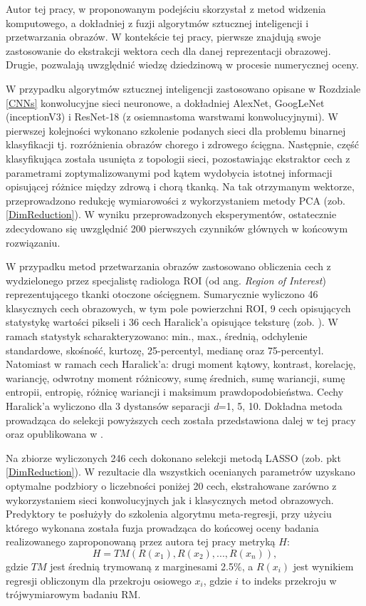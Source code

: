 Autor tej pracy, w proponowanym podejściu skorzystał z metod widzenia komputowego, a dokładniej z fuzji algorytmów sztucznej inteligencji i przetwarzania obrazów. W kontekście tej pracy, pierwsze znajdują swoje zastosowanie do ekstrakcji wektora cech dla danej reprezentacji obrazowej. Drugie, pozwalają uwzględnić wiedzę dziedzinową w procesie numerycznej oceny.

W przypadku algorytmów sztucznej inteligencji zastosowano  opisane w Rozdziale \ref{CNNs} konwolucyjne sieci neuronowe, a dokładniej AlexNet, GoogLeNet (inceptionV3) i ResNet-18 (z osiemnastoma warstwami konwolucyjnymi). W pierwszej kolejności wykonano szkolenie podanych sieci dla problemu binarnej klasyfikacji tj. rozróżnienia obrazów chorego i zdrowego ścięgna. Następnie, część klasyfikująca została usunięta z topologii sieci, pozostawiając ekstraktor cech z parametrami zoptymalizowanymi pod kątem wydobycia istotnej informacji opisującej różnice między zdrową i chorą tkanką. Na tak otrzymanym wektorze, przeprowadzono redukcję wymiarowości z wykorzystaniem metody PCA (zob. \ref{DimReduction}). W wyniku przeprowadzonych eksperymentów, ostatecznie zdecydowano się uwzględnić 200 pierwszych czynników głównych w końcowym rozwiązaniu.

W przypadku metod przetwarzania obrazów zastosowano obliczenia cech z wydzielonego przez specjalistę radiologa ROI (od ang. \textit{Region of Interest}) reprezentującego tkanki otoczone ościęgnem. Sumarycznie wyliczono 46 klasycznych cech obrazowych, w tym pole powierzchni ROI, 9 cech opisujących statystykę wartości pikseli i 36 cech Haralick'a opisujące teksturę (zob. \cite{Haralick1973}). W ramach statystyk scharakteryzowano: min., max., średnią, odchylenie standardowe, skośność, kurtozę, 25-percentyl, medianę oraz 75-percentyl. Natomiast w ramach cech Haralick'a: drugi moment kątowy, kontrast, korelację, wariancję, odwrotny moment różnicowy, sumę średnich, sumę wariancji, sumę entropii, entropię, różnicę wariancji i maksimum prawdopodobieństwa. Cechy Haralick'a wyliczono dla 3 dystansów separacji \textit{d}=1, 5, 10. Dokładna metoda prowadząca do selekcji powyższych cech została przedstawiona dalej w tej pracy oraz opublikowana w \cite{Nowosielski17}.  

Na zbiorze wyliczonych 246 cech dokonano selekcji metodą LASSO (zob. pkt \ref{DimReduction}). W rezultacie dla wszystkich ocenianych parametrów uzyskano optymalne podzbiory o liczebności poniżej 20 cech, ekstrahowane zarówno z wykorzystaniem sieci konwolucyjnych jak i klasycznych metod obrazowych. Predyktory te posłużyły do szkolenia algorytmu meta-regresji, przy użyciu którego wykonana została fuzja prowadząca do końcowej oceny badania realizowanego zaproponowaną przez autora tej pracy metryką $H$:
\begin{equation}
\label{ecq:H}
H = TM(R(x_1), R(x_2),..., R(x_n)),
\end{equation}
gdzie $TM$ jest średnią trymowaną z marginesami 2.5\%, a $R(x_i)$ jest wynikiem regresji obliczonym dla przekroju osiowego $x_i$, gdzie $i$ to indeks przekroju w trójwymiarowym badaniu RM.

